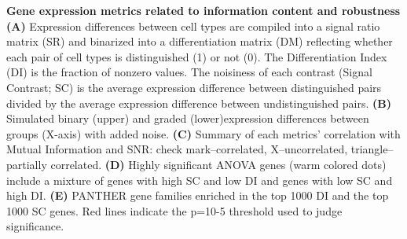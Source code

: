 \textbf{Gene expression metrics related to information content and robustness}
\textbf{(A)} Expression differences between cell types are compiled into a signal ratio matrix (SR) and binarized into a differentiation matrix (DM) reflecting whether each pair of cell types is distinguished (1) or not (0). The Differentiation Index (DI) is the fraction of nonzero values. The noisiness of each contrast (Signal Contrast; SC) is the average expression difference between distinguished pairs divided by the average expression difference between undistinguished pairs. 
\textbf{(B)} Simulated binary (upper) and graded (lower)expression differences between groups (X-axis) with added noise. 
\textbf{(C)} Summary of each metrics' correlation with Mutual Information and SNR: check mark--correlated, X--uncorrelated, triangle--partially correlated.
\textbf{(D)} Highly significant ANOVA genes (warm colored dots) include a mixture of genes with high SC and low DI and genes with low SC and high DI. 
\textbf{(E)} PANTHER gene families enriched in the top 1000 DI and the top 1000 SC genes. Red lines indicate the p=10-5 threshold used to judge significance.
